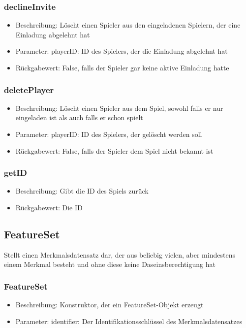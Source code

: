 \documentclass[a4paper]{scrreprt}
\begin{document}
	\subsubsection{declineInvite}
	\begin{itemize}
		\item Beschreibung: Löscht einen Spieler aus den eingeladenen Spielern, der eine Einladung abgelehnt hat
		\item Parameter: playerID: ID des Spielers, der die Einladung abgelehnt hat
		\item Rückgabewert: False, falls der Spieler gar keine aktive Einladung hatte
	\end{itemize}
	\subsubsection{deletePlayer}
	\begin{itemize}
		\item Beschreibung: Löscht einen Spieler aus dem Spiel, sowohl falls er nur eingeladen ist als auch falls er schon spielt
		\item Parameter: playerID: ID des Spielers, der gelöscht werden soll
		\item Rückgabewert: False, falls der Spieler dem Spiel nicht bekannt ist
	\end{itemize}
	\subsubsection{getID}
	\begin{itemize}
	\item Beschreibung: Gibt die ID des Spiels zurück
	\item Rückgabewert: Die ID
	\end{itemize}
	
	\subsection{FeatureSet}
	Stellt einen Merkmalsdatensatz dar, der aus beliebig vielen, aber mindestens einem Merkmal besteht und ohne diese keine Daseinsberechtigung hat
	\subsubsection{FeatureSet}
		\begin{itemize}
		\item Beschreibung: Konstruktor, der ein FeatureSet-Objekt erzeugt
		\item Parameter: identifier: Der Identifikationsschlüssel des Merkmalsdatensatzes
		\end{itemize}
\end{document}
